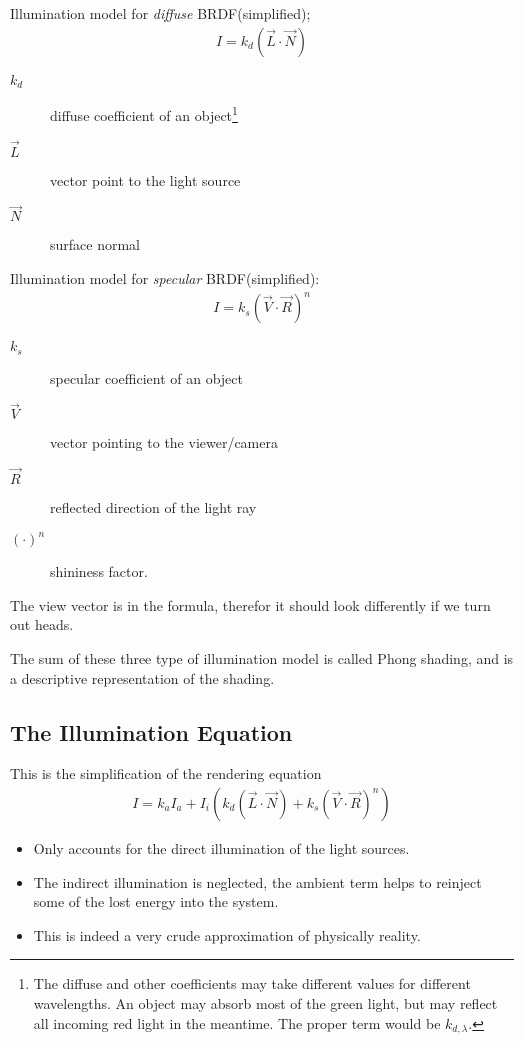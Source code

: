 \documentclass[../pbr.tex]{subfile}
\begin{document}
Illumination model for \textit{diffuse} BRDF(simplified);
\begin{align*}
  I=k_d\left(\vec{L}\cdot\vec{N}\right)
\end{align*}
\begin{description}
  \item[$k_d$] diffuse coefficient of an object\footnote{The diffuse and other
      coefficients may take different values for different wavelengths. An
      object may absorb most of the green light, but may reflect all incoming
      red light in the meantime. The proper term would be $k_{d,\lambda}$.}
  \item[$\vec{L}$] vector point to the light source
  \item[$\vec{N}$] surface normal
\end{description}

Illumination model for \textit{specular} BRDF(simplified):
\begin{align*}
  I=k_s{\left(\vec{V}\cdot\vec{R}\right)}^n
\end{align*}
\begin{description}
  \item[$k_s$] specular coefficient of an object
  \item[$\vec{V}$] vector pointing to the viewer/camera
  \item[$\vec{R}$] reflected direction of the light ray
  \item[${\left(\cdot\right)}^n$] shininess factor.
\end{description}
The view vector is in the formula, therefor it should look differently if we
turn out heads.

The sum of these three type of illumination model is called Phong shading, and
is a descriptive representation of the shading.

\subsection{The Illumination Equation}%
\label{sub:the_illumination_equation}

This is the simplification of the rendering equation
\begin{align*}
  I=k_aI_a+I_i\left(k_d\left(\vec{L}\cdot\vec{N}\right)+k_s{\left(\vec{V}\cdot\vec{R}\right)}^n\right)
\end{align*}
\begin{itemize}
  \item Only accounts for the direct illumination of the light sources.
  \item The indirect illumination is neglected, the ambient term helps to
    reinject some of the lost energy into the system.
  \item This is indeed a very crude approximation of physically reality.
\end{itemize}
\end{document}
